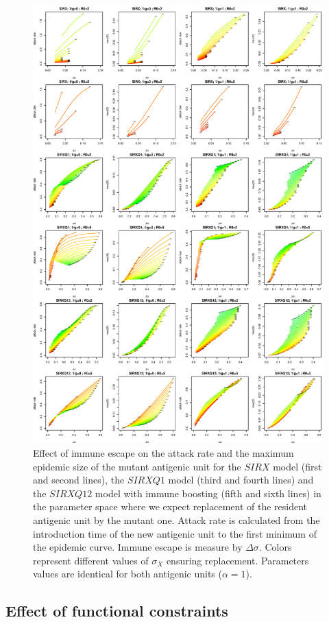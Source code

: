 \begin{figure}[!hp]
  \center
  \includegraphics[width=0.8\linewidth]{texte/article3/appendix_diamond/graph/attak.eps}
  \caption{Effect of immune escape on the attack rate and the maximum
    epidemic size of the mutant antigenic unit for the $SIRX$ model
    (first and second lines), the $SIRXQ1$ model (third and fourth
    lines) and the $SIRXQ12$ model with immune boosting (fifth and sixth
    lines) in the parameter space where we expect replacement of the
    resident antigenic unit by the mutant one. Attack rate is
    calculated from the introduction time of the new antigenic unit to
    the first minimum of the epidemic curve. Immune escape is measure
    by $\Delta\sigma$.  Colors represent different values of
    $\sigma_X$ ensuring replacement. Parameters values are identical for
    both antigenic units ($\alpha=1$).}
  \label{fig:sirx_attak}
\end{figure}

\clearpage

\subsection{Effect of functional constraints}


